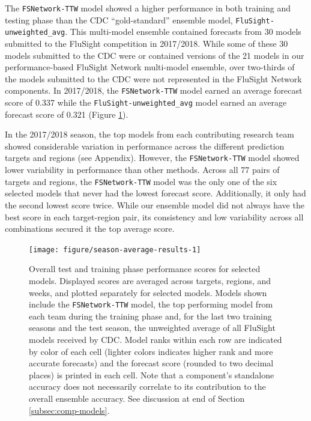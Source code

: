 \documentclass{article}\usepackage[]{graphicx}\usepackage[]{color}
\newenvironment{knitrout}{}{} %
\begin{document}
The {\tt FSNetwork-TTW} model showed a higher performance in both training and testing phase than the CDC ``gold-standard'' ensemble model, {\tt FluSight-unweighted\_avg}.
This multi-model ensemble contained forecasts from 30 models submitted to the FluSight competition in 2017/2018.
While some of these 30 models submitted to the CDC were or contained versions of the 21 models in our performance-based FluSight Network multi-model ensemble, over two-thirds of the models submitted to the CDC were not represented in the FluSight Network components.
In 2017/2018, the {\tt FSNetwork-TTW} model earned an average forecast score of
0.337 
while the {\tt FluSight-unweighted\_avg} model earned an average forecast score of
0.321 (Figure \ref{fig:season-average-results}).

In the 2017/2018 season, the top models from each contributing research team showed considerable variation in performance across the different prediction targets and regions (see Appendix). 
However, the {\tt FSNetwork-TTW} model showed lower variability in performance than other methods. 
Across all 77 pairs of targets and regions, the {\tt FSNetwork-TTW} model was the only one of the six selected models that never had the lowest forecast score.
Additionally, it only had the second lowest score twice. 
While our ensemble model did not always have the best score in each target-region pair, its consistency and low variability across all combinations secured it the top average score.



\begin{knitrout}
\color{fgcolor}\begin{figure}
\texttt{[image: figure/season-average-results-1]} \caption{Overall test and training phase performance scores for selected models. Displayed scores are averaged across targets, regions, and weeks, and plotted separately for selected models. Models shown include the {\tt FSNetwork-TTW} model, the top performing model from each team during the training phase and, for the last two training seasons and the test season, the unweighted average of all FluSight models received by CDC. Model ranks within each row are indicated by color of each cell (lighter colors indicates higher rank and more accurate forecasts) and the forecast score (rounded to two decimal places) is printed in each cell. Note that a component's standalone accuracy does not necessarily correlate to its contribution to the overall ensemble accuracy.  See discussion at end of Section \ref{subsec:comp-models}.}\label{fig:season-average-results}
\end{figure}


\end{knitrout}
\end{document}

